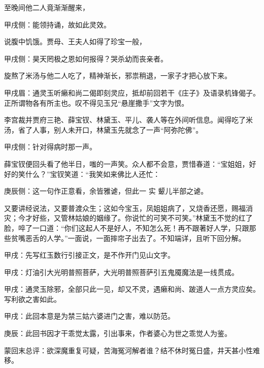 \begin{parag}
    至晚间他二人竟渐渐醒来，\begin{note}甲戌侧：能领持诵，故如此灵效。\end{note}说腹中饥饿。贾母、王夫人如得了珍宝一般，\begin{note}甲戌侧：昊天罔极之恩如何报得？哭杀幼而丧亲者。\end{note}旋熬了米汤与他二人吃了，精神渐长，邪祟稍退，一家子才把心放下来。\begin{note}甲戌眉：通灵玉听癞和尚二偈即刻灵应，抵却前回若干《庄子》及语录机锋偈子。正所谓物各有所主也。叹不得见玉兄“悬崖撒手”文字为恨。\end{note}李宫裁并贾府三艳、薛宝钗、林黛玉、平儿、袭人等在外间听信息。闻得吃了米汤，省了人事，别人未开口，林黛玉先就念了一声“阿弥陀佛”。\begin{note}甲戌侧：针对得病时那一声。\end{note}薛宝钗便回头看了他半日，嗤的一声笑。众人都不会意，贾惜春道：“宝姐姐，好好的笑什么？”宝钗笑道：“我笑如来佛比人还忙：\begin{note}庚辰侧：这一句作正意看，余皆雅谑，但此一 实 颦儿半部之谑。\end{note}又要讲经说法，又要普渡众生；这如今宝玉，凤姐姐病了，又烧香还愿，赐福消灾；今才好些，又管林姑娘的姻缘了。你说忙的可笑不可笑。”林黛玉不觉的红了脸，啐了一口道：“你们这起人不是好人，不知怎么死！再不跟著好人学，只跟那些贫嘴恶舌的人学。”一面说，一面摔帘子出去了。不知端详，且听下回分解。
\end{parag}


\begin{parag}
    \begin{note}甲戌：先写红玉数行引接正文，是不作开门见山文字。\end{note}
\end{parag}


\begin{parag}
    \begin{note}甲戌：灯油引大光明普照菩萨，大光明普照菩萨引五鬼魇魔法是一线贯成。\end{note}
\end{parag}


\begin{parag}
    \begin{note}甲戌：通灵玉除邪，全部只此一见，却又不灵，遇癞和尚、跛道人一点方灵应矣。写利欲之害如此。\end{note}
\end{parag}


\begin{parag}
    \begin{note}甲戌：此回本意是为禁三姑六婆进门之害，难以防范。\end{note}
\end{parag}


\begin{parag}
    \begin{note}庚辰：此回书因才干乖觉太露，引出事来，作者婆心为世之乖觉人为鉴。\end{note}
\end{parag}


\begin{parag}
    \begin{note}蒙回末总评：欲深魔重复可疑，苦海冤河解者谁？结不休时冤日盛，井天甚小性难移。\end{note}
\end{parag}

